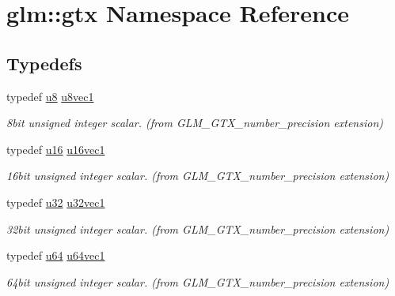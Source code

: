 \hypertarget{namespaceglm_1_1gtx}{}\section{glm\+:\+:gtx Namespace Reference}
\label{namespaceglm_1_1gtx}
\subsection*{Typedefs}
\begin{DoxyCompactItemize}
\item 
typedef \mbox{\hyperlink{group__gtc__type__precision_ga5e3dc67373d5068997d2d9f41c9024d2}{u8}} \mbox{\hyperlink{group__gtx__number__precision_ga35ae7849593a354420e4f52d1b36c2d6}{u8vec1}}
\begin{DoxyCompactList}\small\item\em 8bit unsigned integer scalar. (from G\+L\+M\+\_\+\+G\+T\+X\+\_\+number\+\_\+precision extension) \end{DoxyCompactList}\item 
typedef \mbox{\hyperlink{group__gtc__type__precision_gae7a1571503f83d2264ddfa705a6b082a}{u16}} \mbox{\hyperlink{group__gtx__number__precision_ga807d7e5f24e981b1575bd40ca159781d}{u16vec1}}
\begin{DoxyCompactList}\small\item\em 16bit unsigned integer scalar. (from G\+L\+M\+\_\+\+G\+T\+X\+\_\+number\+\_\+precision extension) \end{DoxyCompactList}\item 
typedef \mbox{\hyperlink{group__gtc__type__precision_ga54e837745059fd29017bed71cfa0a8db}{u32}} \mbox{\hyperlink{group__gtx__number__precision_gac46a7890b20928df83e734c3ea9557d4}{u32vec1}}
\begin{DoxyCompactList}\small\item\em 32bit unsigned integer scalar. (from G\+L\+M\+\_\+\+G\+T\+X\+\_\+number\+\_\+precision extension) \end{DoxyCompactList}\item 
typedef \mbox{\hyperlink{group__gtc__type__precision_ga71cedd4972f9cb1a5e14dfe5ab83ecd7}{u64}} \mbox{\hyperlink{group__gtx__number__precision_ga92812a1d7e746bcaba61d2f5a64afc52}{u64vec1}}
\begin{DoxyCompactList}\small\item\em 64bit unsigned integer scalar. (from G\+L\+M\+\_\+\+G\+T\+X\+\_\+number\+\_\+precision extension) \end{DoxyCompactList}\item 

\end{DoxyCompactItemize}
